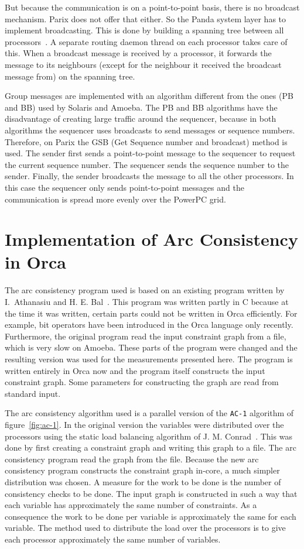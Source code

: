 \documentclass[a4paper,11pt]{article}
\begin{document}
But because the communication is on a point-to-point basis, there is
no broadcast mechanism. Parix does not offer that either. So the Panda
system layer has to implement broadcasting. This is done by building
a spanning tree between all processors~\cite{article:tocs}.
A separate routing daemon
thread on each processor takes care of this. When a broadcast message
is received by a processor, it forwards the message to its neighbours
(except for the neighbour it received the broadcast message from)
on the spanning tree.

Group messages are implemented with an algorithm different from the ones
(PB and BB) used by Solaris and Amoeba. The PB and BB algorithms have
the disadvantage of creating large traffic around the sequencer, because
in both algorithms the sequencer uses broadcasts to send messages or
sequence numbers.
Therefore, on Parix the GSB (Get Sequence number and broadcast) method
is used.
The sender first sends a point-to-point message to the sequencer to
request the current sequence number. The sequencer sends the sequence
number to the sender. Finally, the sender broadcasts the message to
all the other processors. In this case the sequencer only sends 
point-to-point messages and the communication is spread more evenly
over the PowerPC grid.

\section{Implementation of Arc Consistency in Orca}
\label{sec:acp}

The arc consistency program used is based on an existing program written
by I.~Athanasiu and H. E. Bal~\cite{article:irina}.
This program was written partly in
C because at the time it was written, certain parts could not be written
in Orca efficiently. For example, bit operators have been introduced in
the Orca language only recently.
Furthermore, the original program read
the input constraint graph from a file,
which is very slow on Amoeba. These parts of the program
were changed and the resulting
version was used for the measurements presented here. The program is written
entirely in Orca now and the program itself constructs the input
constraint graph. 
Some parameters for constructing the graph are read from standard input.

The arc consistency algorithm used is a parallel version of the {\tt AC-1}
algorithm of figure~\ref{fig:ac-1}.
In the original version the variables were distributed over the processors
using the static load balancing algorithm of J. M. Conrad~\cite{article:conrad}.
This was done by first creating a constraint graph and writing this graph
to a file. The arc consistency program read the graph from the file.
Because the new arc consistency program constructs the constraint graph
in-core, a much simpler distribution was chosen.
A measure for the work to be done is the number of consistency checks to
be done. 
The input graph is constructed in such a way that 
each variable has approximately the same number of constraints.
As a consequence the work to be done per variable is approximately the same
for each variable.
The method used to distribute the load over the processors is to give
each processor approximately the same number of variables.
\end{document}

